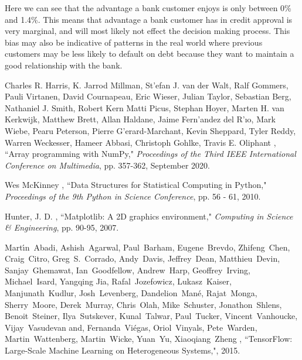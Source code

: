\documentclass[12pt]{article}
\begin{document}
	
	Here we can see that the advantage a bank customer enjoys is only between 0\% and 1.4\%. This means that advantage a bank customer has in credit approval is very marginal, and will most likely not effect the decision making process. This bias may also be indicative of patterns in the real world where previous customers may be less likely to default on debt because they want to maintain a good relationship with the bank. 
	
	\newpage
	\begin{thebibliography}{100} %


	
	
	 Charles R. Harris, K. Jarrod Millman, St{'{e}}fan J.
van der Walt, Ralf Gommers, Pauli Virtanen, David
Cournapeau, Eric Wieser, Julian Taylor, Sebastian
Berg, Nathaniel J. Smith, Robert Kern Matti Picus,
Stephan Hoyer, Marten H. van Kerkwijk, Matthew
Brett, Allan Haldane, Jaime Fern{'{a}}ndez del
R{'{\i}}o, Mark Wiebe, Pearu Peterson, Pierre
G{'{e}}rard-Marchant, Kevin Sheppard, Tyler Reddy,
Warren Weckesser, Hameer Abbasi, Christoph Gohlke,
Travis E. Oliphant
, ``Array programming with {NumPy}," \emph{Proceedings of the Third IEEE
International Conference on Multimedia}, pp. 357-362, September 2020.

	
	
	 {W}es {M}c{K}inney
, ``{D}ata {S}tructures for {S}tatistical {C}omputing in {P}ython," \emph{{P}roceedings of the 9th {P}ython in {S}cience {C}onference}, pp. 56 - 61, 2010.

	
	
	 Hunter, J. D.
, ``Matplotlib: A 2D graphics environment," \emph{Computing in Science \& Engineering}, pp. 90-95, 2007.

	
	
	 Mart\'{\i}n~Abadi, Ashish~Agarwal, Paul~Barham, Eugene~Brevdo, Zhifeng~Chen, Craig~Citro, Greg~S.~Corrado, Andy~Davis, Jeffrey~Dean, Matthieu~Devin, Sanjay~Ghemawat, Ian~Goodfellow, Andrew~Harp, Geoffrey~Irving, Michael~Isard, Yangqing Jia, Rafal~Jozefowicz, Lukasz~Kaiser, Manjunath~Kudlur, Josh~Levenberg, Dandelion~Man\'{e}, Rajat~Monga, Sherry~Moore, Derek~Murray, Chris~Olah, Mike~Schuster, Jonathon~Shlens, Benoit~Steiner, Ilya~Sutskever, Kunal~Talwar, Paul~Tucker, Vincent~Vanhoucke, Vijay~Vasudevan and, Fernanda~Vi\'{e}gas, Oriol~Vinyals, Pete~Warden, Martin~Wattenberg, Martin~Wicke, Yuan~Yu, Xiaoqiang~Zheng
, ``{TensorFlow}: Large-Scale Machine Learning on Heterogeneous Systems,", 2015.


\end{thebibliography}
\end{document}

